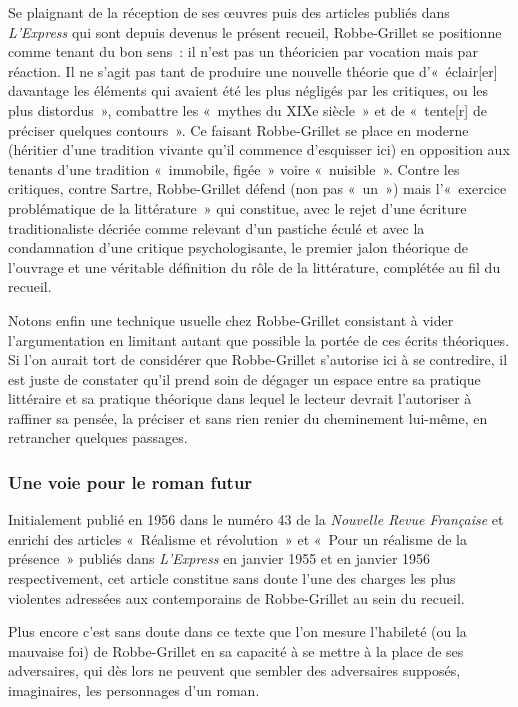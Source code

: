 Se plaignant de la réception de ses œuvres puis des articles publiés dans \textit{L'Express} qui sont depuis devenus le présent recueil, Robbe-Grillet se positionne comme tenant du bon sens~: il n'est pas un théoricien par vocation mais par réaction. Il ne s'agit pas tant de produire une nouvelle théorie que d'«~éclair[er] davantage les éléments qui avaient été les plus négligés par les critiques, ou les plus distordus~», combattre les «~mythes du XIXe siècle~» et de «~tente[r] de préciser quelques contours~». Ce faisant Robbe-Grillet se place en moderne (héritier d'une tradition vivante qu'il commence d'esquisser ici) en opposition aux tenants d'une tradition «~immobile, figée~» voire «~nuisible~». Contre les critiques, contre Sartre, Robbe-Grillet défend (non pas «~un~») mais l'«~exercice problématique de la littérature~» qui constitue, avec le rejet d'une écriture traditionaliste décriée comme relevant d'un pastiche éculé et avec la condamnation d'une critique psychologisante, le premier jalon théorique de l'ouvrage et une véritable définition du rôle de la littérature, complétée au fil du recueil.

Notons enfin une technique usuelle chez Robbe-Grillet consistant à vider l'argumentation en limitant autant que possible la portée de ces écrits théoriques. Si l'on aurait tort de considérer que Robbe-Grillet s'autorise ici à se contredire, il est juste de constater qu'il prend soin de dégager un espace entre sa pratique littéraire et sa pratique théorique dans lequel le lecteur devrait l'autoriser à raffiner sa pensée, la préciser et sans rien renier du cheminement lui-même, en retrancher quelques passages.


\subsubsection{Une voie pour le roman futur}
Initialement publié en 1956 dans le numéro 43 de la\textit{ Nouvelle Revue Française} et enrichi des articles «~Réalisme et révolution~» et «~Pour un réalisme de la présence~» publiés dans \textit{L'Express} en janvier 1955 et en janvier 1956 respectivement, cet article constitue sans doute l'une des charges les plus violentes adressées aux contemporains de Robbe-Grillet au sein du recueil.

Plus encore c'est sans doute dans ce texte que l'on mesure l'habileté (ou la mauvaise foi) de Robbe-Grillet en sa capacité à se mettre à la place de ses adversaires, qui dès lors ne peuvent que sembler des adversaires supposés, imaginaires, les personnages d'un roman.

